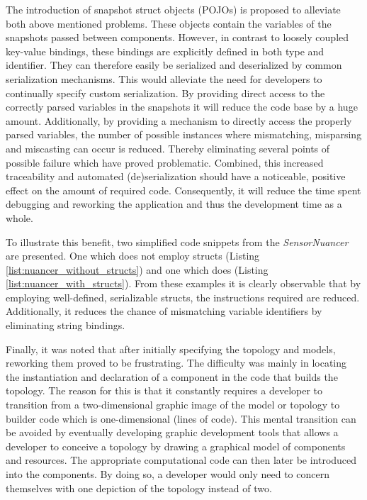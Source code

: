 The introduction of snapshot struct objects (POJOs) is proposed to alleviate both above mentioned problems. These objects contain the variables of the snapshots passed between components. However, in contrast to loosely coupled key-value bindings, these bindings are explicitly defined in both type and identifier. They can therefore easily be serialized and deserialized by common serialization mechanisms. This would alleviate the need for developers to continually specify custom serialization. By providing direct access to the correctly parsed variables in the snapshots it will reduce the code base by a huge amount. Additionally, by providing a mechanism to directly access the properly parsed variables, the number of possible instances where mismatching, misparsing and miscasting can occur is reduced. Thereby eliminating several points of possible failure which have proved problematic. Combined, this increased traceability and automated (de)serialization should have a noticeable, positive effect on the amount of required code. Consequently, it will reduce the time spent debugging and reworking the application and thus the development time as a whole.

To illustrate this benefit, two simplified code snippets from the \emph{SensorNuancer} are presented. One which does not employ structs (Listing \ref{list:nuancer_without_structs}) and one which does (Listing \ref{list:nuancer_with_structs}). From these examples it is clearly observable that by employing well-defined, serializable structs, the instructions required are reduced. Additionally, it reduces the chance of mismatching variable identifiers by eliminating string bindings.



Finally, it was noted that after initially specifying the topology and models, reworking them proved to be frustrating. The difficulty was mainly in locating the instantiation and declaration of a component in the code that builds the topology. The reason for this is that it constantly requires a developer to transition from a two-dimensional graphic image of the model or topology to builder code which is one-dimensional (lines of code). This mental transition can be avoided by eventually developing graphic development tools that allows a developer to conceive a topology by drawing a graphical model of components and resources. The appropriate computational code can then later be introduced into the components. By doing so, a developer would only need to concern themselves with one depiction of the topology instead of two.

